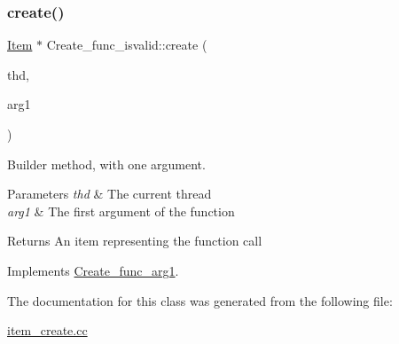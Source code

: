 \subsubsection{\texorpdfstring{create()}{create()}}
{\footnotesize\ttfamily \mbox{\hyperlink{classItem}{Item}} $\ast$ Create\+\_\+func\+\_\+isvalid\+::create (\begin{DoxyParamCaption}\item[{T\+HD $\ast$}]{thd,  }\item[{\mbox{\hyperlink{classItem}{Item}} $\ast$}]{arg1 }\end{DoxyParamCaption})\hspace{0.3cm}{\ttfamily [virtual]}}

Builder method, with one argument. 
\begin{DoxyParams}{Parameters}
{\em thd} & The current thread \\
\hline
{\em arg1} & The first argument of the function \\
\hline
\end{DoxyParams}
\begin{DoxyReturn}{Returns}
An item representing the function call 
\end{DoxyReturn}


Implements \mbox{\hyperlink{classCreate__func__arg1_a3e9a98f755cd82c3e762e334c955a8c9}{Create\+\_\+func\+\_\+arg1}}.



The documentation for this class was generated from the following file\+:\begin{DoxyCompactItemize}
\item 
\mbox{\hyperlink{item__create_8cc}{item\+\_\+create.\+cc}}\end{DoxyCompactItemize}
